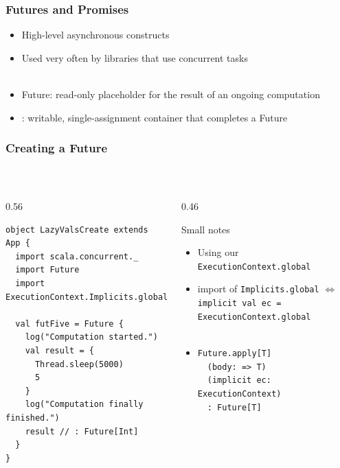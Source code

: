 \documentclass[aspectratio=169]{beamer}
\begin{document}
\begin{frame}[t]\frametitle{Futures and Promises}

\begin{itemize}
  \item High-level asynchronous constructs
  \item Used very often by libraries that use concurrent tasks
  \\~
  \item \alert{Future}:
    read-only placeholder for the result of an ongoing computation
  \item {}:
    writable, single-assignment container that completes a Future
\end{itemize}

\end{frame}

\begin{frame}[fragile]\frametitle{Creating a Future}
~\\[-8mm]
\begin{columns}
\begin{column}{0.56\textwidth}
~\\
\begin{lstlisting}[emph={execute,sleep,log,Future}]
object LazyValsCreate extends App {
  import scala.concurrent._
  import Future
  import ExecutionContext.Implicits.global
  
  val futFive = Future {
    log("Computation started.")
    val result = {
      Thread.sleep(5000)
      5
    }
    log("Computation finally finished.")
    result // : Future[Int]
  }
}
\end{lstlisting}
\end{column}
\begin{column}{0.46\textwidth}
\begin{block}{Small notes}
\begin{itemize}
  \item Using our \texttt{ExecutionContext.global}
  \item import of \texttt{Implicits.global} $\Leftrightarrow$
  \\ \texttt{implicit val ec = ExecutionContext.global}
  \pause\\~
  \\\item{\footnotesize\texttt{Future.apply[T]}}
  \\~~{\footnotesize\texttt{(body: => T)}}
  \\~~{\footnotesize\texttt{(implicit ec: ExecutionContext)}}
  \\~~{\footnotesize\texttt{: Future[T]}}
\end{itemize}
\end{block}
\end{column}
\end{columns}
\end{frame}
\end{document}
